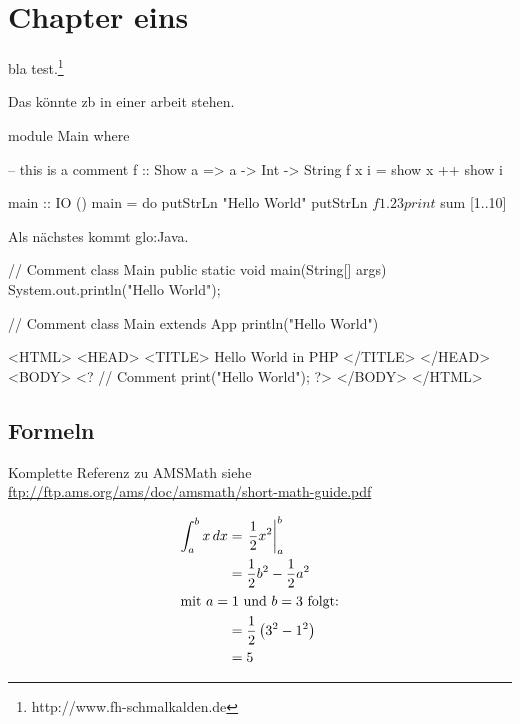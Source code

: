 \chapter{Chapter eins}
bla test.\footnote{http://www.fh-schmalkalden.de}

Das könnte \gls{zb} in einer arbeit stehen.

\begin{code}[label=listinghaskell,caption=This is Haskell]
module Main where

-- this is a comment
f :: Show a => a -> Int -> String
f x i = show x ++ show i

main :: IO ()
main = do
  putStrLn "Hello World"
  putStrLn $ f 1.2 3
  print $ sum [1..10]
\end{code}

Als nächstes kommt \gls{glo:Java}.

\begin{code}[label=listingjava,caption={This is Java}]
// Comment
class Main {
  public static void main(String[] args) {
    System.out.println("Hello World");
  }
}
\end{code}

\begin{code}[label=listingscala,caption=This is Scala]
// Comment
class Main extends App {
  println("Hello World")
}
\end{code}

\begin{Code}
	\centering
	
\end{Code}
\begin{code}[label=listingphp,caption={This is PHP}]
<HTML>
<HEAD>
<TITLE> Hello World in PHP </TITLE>
</HEAD>
<BODY>
<?
// Comment
 print("Hello World");
?>
</BODY>
</HTML>
\end{code}

\section{Formeln}

Komplette Referenz zu AMSMath siehe \\
\url{ftp://ftp.ams.org/ams/doc/amsmath/short-math-guide.pdf}

\begin{align}
 \int_{a}^{b} x\,dx
 & = \left.\frac{1}{2} x^2\right\vert_{a}^{b}\\
 & = \frac{1}{2} b^2 - \frac{1}{2} a^2 \\
 \intertext{mit $a=1$ und $b=3$ folgt:}
 \notag
 & = \frac{1}{2} \left(3^2 - 1^2\right)\\
 & = 5
\end{align}

